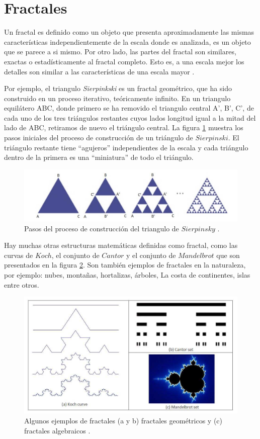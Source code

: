  
 \section{Fractales}
Un fractal es definido como un objeto que presenta aproximadamente las mismas características independientemente de la escala donde es analizada, es un objeto que se parece a si mismo. Por otro lado, las partes del fractal son similares, exactas o estadísticamente  al  fractal completo. Esto es, a una escala mejor los detalles son similar a las características de una escala mayor \cite{Schroeder:1991,DMFractalsBook}.
 
Por ejemplo, el triangulo \textit{Sierpinkski} es un fractal geométrico, que ha sido construido en un proceso iterativo, teóricamente infinito.  En un triangulo equilátero ABC, donde primero se ha removido el triangulo central A', B', C',  de cada uno de los tres triángulos restantes cuyos lados longitud igual a la mitad del lado de ABC, retiramos de nuevo el triángulo central. La figura \ref{fig:ima1} muestra los pasos iniciales del proceso de construcción de un triángulo de $Sierpinski$. El triángulo restante tiene ``agujeros'' independientes de la escala y cada triángulo dentro de la primera es una ``miniatura'' de todo el triángulo.

\begin{figure}[h]
\centering
\includegraphics[scale=0.85]{chapter4/ima1.png}
\caption{Pasos del proceso de construcción del triangulo de $Sierpinsky$ \cite{DMFractalsBook}.}
\label{fig:ima1}
\end{figure}
Hay muchas otras estructuras matemáticas definidas como fractal, como las curvas de   $Koch$,  el conjunto de $Cantor$ y el conjunto de $Mandelbrot$ que son presentados en la figura \ref{fig:ima2}. Son también ejemplos de fractales en la naturaleza, por ejemplo: nubes, montañas, hortalizas, árboles, La costa de continentes, islas entre otros.
\begin{figure}[h]
\centering
\includegraphics[scale=1.3]{chapter4/ima2.png}
\caption{Algunos ejemplos de fractales (a y b) fractales geométricos y (c) fractales algebraicos \cite{DMFractalsBook}.}
\label{fig:ima2}
\end{figure}


